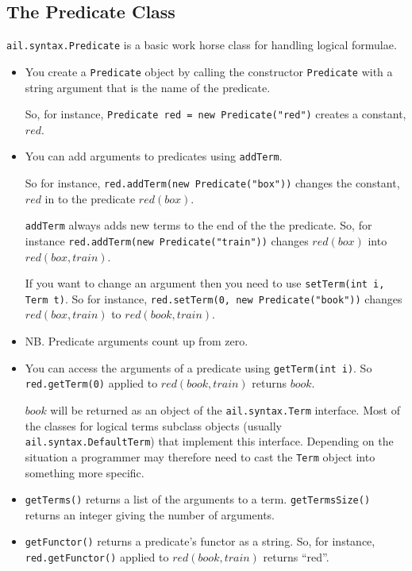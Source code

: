 \subsection{The Predicate Class}
\texttt{ail.syntax.Predicate} is a basic work horse class for handling logical formulae.

\begin{itemize}
\item You create a \texttt{Predicate} object by calling the constructor \texttt{Predicate} with a string argument that is the name of the predicate.

So, for instance, \texttt{Predicate red = new Predicate("red")} creates a constant, $red$.  
\item You can add arguments to predicates using \texttt{addTerm}.

So for instance, \texttt{red.addTerm(new Predicate("box"))} changes the constant, $red$ in to the predicate $red(box)$.  

\texttt{addTerm} always adds new terms to the end of the the predicate.  So, for instance \texttt{red.addTerm(new Predicate("train"))} changes $red(box)$ into $red(box, train)$.  

If you want to change an argument then you need to use \texttt{setTerm(int i, Term t)}.  So for instance, \texttt{red.setTerm(0, new Predicate("book"))} changes $red(box, train)$ to $red(book, train)$.
\item NB.  Predicate arguments count up from zero.
\item You can access the arguments of a predicate using \texttt{getTerm(int i)}.  So \texttt{red.getTerm(0)} applied to $red(book, train)$ returns $book$.

\begin{sloppypar}
$book$ will be returned as an object of the \texttt{ail.syntax.Term} interface.  Most of the classes for logical terms subclass objects (usually \texttt{ail.syntax.DefaultTerm}) that implement this interface.  Depending on the situation a programmer may therefore need to cast the \texttt{Term} object into something more specific.
\end{sloppypar}
\item \texttt{getTerms()} returns a list of the arguments to a term.  \texttt{getTermsSize()} returns an integer giving the number of arguments.
\item \texttt{getFunctor()} returns a predicate's functor as a string.  So, for instance, \texttt{red.getFunctor()} applied to $red(book, train)$ returns ``red''.
\end{itemize}

